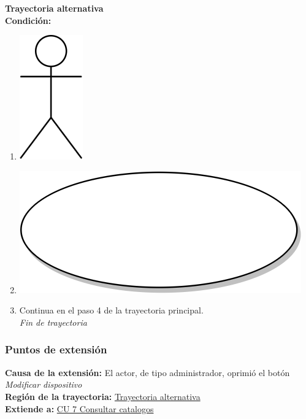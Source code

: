 \textbf{Trayectoria alternativa} \label{cu_ta_} \\
\textbf{Condición:} \\
 \begin{enumerate}[label=\arabic*]
    \item {\includegraphics[scale=.1]{Capitulo3/img/actor.png} }
    \item {\includegraphics[scale=.05]{Capitulo3/img/proceso.png}}
    \item {Continua en el paso 4 de la trayectoria principal.} \\
    \textit{Fin de trayectoria} \\
\end{enumerate}


\subsubsection{Puntos de extensión}
\noindent \textbf{Causa de la extensión:} El actor, de tipo administrador, oprimió el botón \textit{Modificar dispositivo} \\
\textbf{Región de la trayectoria:} \hyperref[cu_ta_]{Trayectoria alternativa } \\
\textbf{Extiende a:} \hyperref[cu7]{CU 7 Consultar catalogos}
